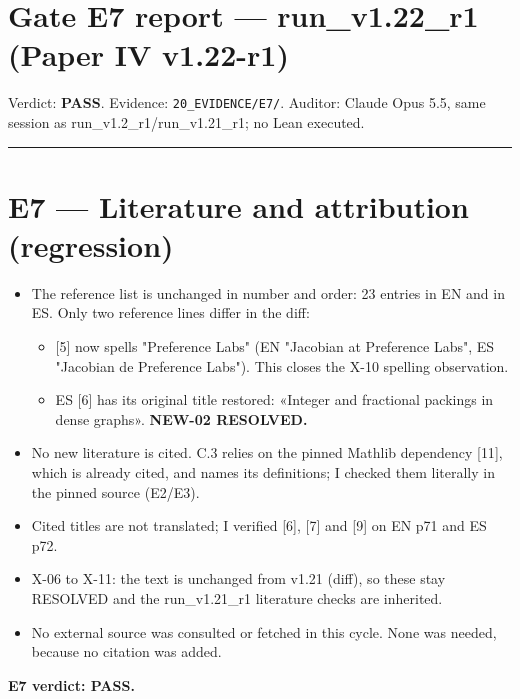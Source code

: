 \documentclass[
]{article}
\author{}
\date{}
\providecommand{\tightlist}{%
  \setlength{\itemsep}{0pt}\setlength{\parskip}{0pt}}
\begin{document}
\section{Gate E7 report --- run\_v1.22\_r1 (Paper IV
v1.22-r1)}\label{gate-e7-report--run_v122_r1-paper-iv-v122-r1}

Verdict: \textbf{PASS}. Evidence: \texttt{20\_EVIDENCE/E7/}. Auditor:
Claude Opus 5.5, same session as run\_v1.2\_r1/run\_v1.21\_r1; no Lean
executed.

\begin{center}\rule{0.5\linewidth}{0.5pt}\end{center}

\section{E7 --- Literature and attribution
(regression)}\label{e7--literature-and-attribution-regression}

\begin{itemize}
\tightlist
\item
  The reference list is unchanged in number and order: 23 entries in EN
  and in ES. Only two reference lines differ in the diff:

  \begin{itemize}
  \tightlist
  \item
    {[}5{]} now spells "Preference Labs" (EN "Jacobian at Preference
    Labs", ES "Jacobian de Preference Labs"). This closes the X-10
    spelling observation.
  \item
    ES {[}6{]} has its original title restored: «Integer and fractional
    packings in dense graphs». \textbf{NEW-02 RESOLVED.}
  \end{itemize}
\item
  No new literature is cited. C.3 relies on the pinned Mathlib
  dependency {[}11{]}, which is already cited, and names its
  definitions; I checked them literally in the pinned source (E2/E3).
\item
  Cited titles are not translated; I verified {[}6{]}, {[}7{]} and
  {[}9{]} on EN p71 and ES p72.
\item
  X-06 to X-11: the text is unchanged from v1.21 (diff), so these stay
  RESOLVED and the run\_v1.21\_r1 literature checks are inherited.
\item
  No external source was consulted or fetched in this cycle. None was
  needed, because no citation was added.
\end{itemize}

\textbf{E7 verdict: PASS.}
\end{document}
